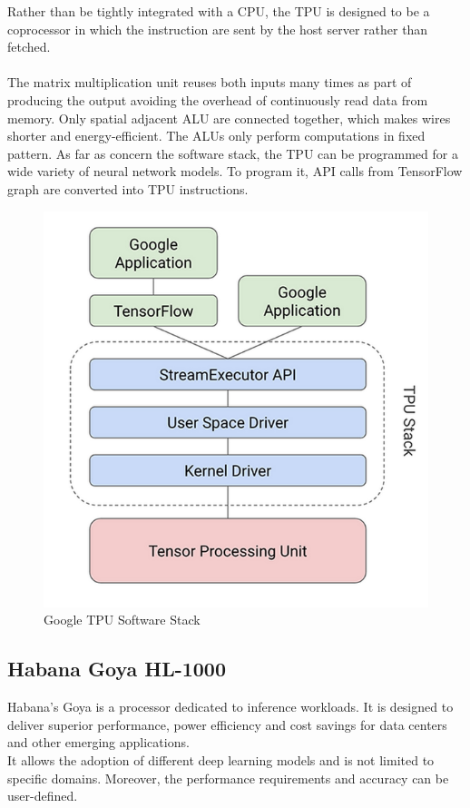 Rather than be tightly integrated with a CPU, the TPU is designed to be a coprocessor in which the instruction are sent by the host server rather than fetched.\\\\
The matrix multiplication unit reuses both inputs many times as part of producing the output avoiding the overhead of continuously read data from memory. Only spatial adjacent ALU are connected together, which makes wires shorter and energy-efficient. The ALUs only perform computations in fixed pattern.
\newpage
As far as concern the software stack, the TPU can be programmed for a wide variety of neural network models. To program it, API calls from TensorFlow graph are converted into TPU instructions.
\begin{figure}[H]
\centering
\captionsetup{justification=centering}
\includegraphics[scale=0.4]{./figure/tpu_sw_stack.PNG}
\caption{Google TPU Software Stack\cite{WEBSITE:9}}
\label{fig:gtpuswstack}
\end{figure}

\subsection{Habana Goya HL-1000}

Habana’s Goya is a processor dedicated to inference workloads. It is designed to deliver superior performance, power efficiency and cost savings for data centers and other emerging applications.\\
It allows the adoption of different deep learning models and is not limited to specific domains. Moreover, the performance requirements and accuracy can be user-defined.\\

